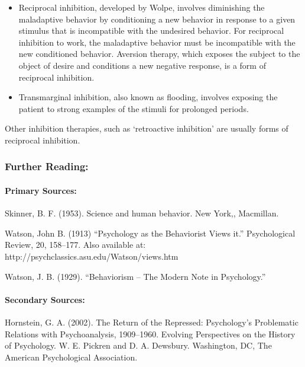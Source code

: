 \begin{itemize}
\item Reciprocal inhibition, developed by Wolpe, involves diminishing the maladaptive behavior by conditioning a new behavior in response to a given stimulus that is incompatible with the undesired behavior. For reciprocal inhibition to work, the maladaptive behavior must be incompatible with the new conditioned behavior. Aversion therapy, which exposes the subject to the object of desire and conditions a new negative response, is a form of reciprocal inhibition.

\item Transmarginal inhibition, also known as flooding, involves exposing the patient to strong examples of the stimuli for prolonged periods.

\end{itemize}

Other inhibition therapies, such as `retroactive inhibition' are usually forms of reciprocal inhibition.

\subsubsection{Further Reading:}
\label{furtherreading:}

\paragraph{Primary Sources:}
\label{primarysources:}

Skinner, B. F. (1953). Science and human behavior. New York,, Macmillan.

Watson, John B. (1913) “Psychology as the Behaviorist Views it.” Psychological Review, 20, 158--177. Also available at: http:\slash \slash psychclassics.asu.edu\slash Watson\slash views.htm

Watson, J. B. (1929). ``Behaviorism -- The Modern Note in Psychology.''

\paragraph{Secondary Sources:}
\label{secondarysources:}

Hornstein, G. A. (2002). The Return of the Repressed: Psychology's Problematic Relations with Psychoanalysis, 1909--1960. Evolving Perspectives on the History of Psychology. W. E. Pickren and D. A. Dewsbury. Washington, DC, The American Psychological Association.

